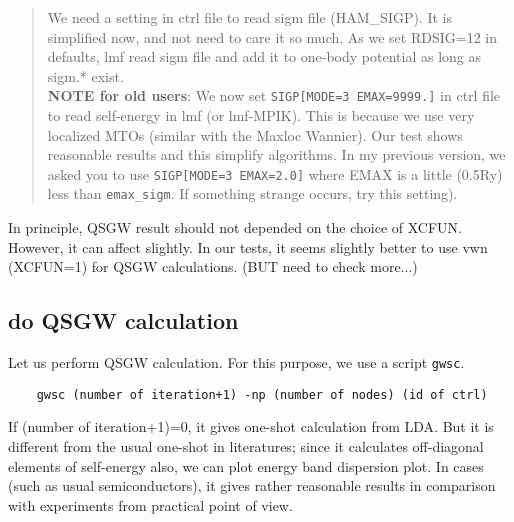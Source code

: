 \documentclass[a4paper,10pt,epsf,fleqn]{article}
\begin{document}
\begin{quote}
We need a setting in ctrl file to read sigm file (HAM\_SIGP). 
It is simplified now, and not need to care it so much.
As we set RDSIG=12 in defaults, lmf read sigm file and add it to one-body
potential as long as sigm.* exist.\\

{\bf NOTE for old users}: We now set \verb+SIGP[MODE=3 EMAX=9999.]+
in ctrl file to read self-energy in lmf (or lmf-MPIK). 
This is because we use very localized MTOs (similar with the Maxloc Wannier).
Our test shows reasonable results and this simplify algorithms.
In my previous version, we asked you to use \verb+SIGP[MODE=3 EMAX=2.0]+
where EMAX is a little (0.5Ry) less than \verb+emax_sigm+. If something
strange occurs, try this setting).
\end{quote}

In principle, QSGW result should not depended on the choice of XCFUN.
However, it can affect slightly. In our tests, it seems slightly better
to use vwn (XCFUN=1) for QSGW calculations. (BUT need to check more...)


\subsection{do QSGW calculation}
\label{fpgw-calc}
Let us perform QSGW calculation. 
For this purpose, we use a script \verb+gwsc+. 
\begin{verbatim}
    gwsc (number of iteration+1) -np (number of nodes) (id of ctrl)
\end{verbatim}
If (number of iteration+1)=0, it gives one-shot calculation from LDA.
But it is different from the usual one-shot in literatures;
since it calculates off-diagonal elements of self-energy also,
we can plot energy band dispersion plot. In cases (such as usual
semiconductors), it gives rather reasonable results in comparison with
experiments from practical point of view.
\end{document}
